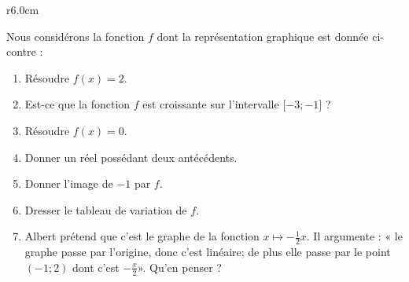 
\begin{exercice}\label{exosmath-0566}

\begin{wrapfigure}{r}{6.0cm}
   \vspace{-1cm}        %
   \centering
   
\end{wrapfigure}

    Nous considérons la fonction \( f\) dont la représentation graphique est donnée ci-contre :

    \begin{enumerate}
        \item
            Résoudre \( f(x)=2\).
        \item
            Est-ce que la fonction \( f\) est croissante sur l'intervalle \( \mathopen[ -3 ;-1 \mathclose]\) ?
        \item
            Résoudre \( f(x)=0\).
        \item
            Donner un réel possédant deux antécédents.
        \item 
            Donner l'image de \( -1\) par \( f\).
        \item
            Dresser le tableau de variation de \( f\).
        \item
            Albert prétend que c'est le graphe de la fonction \( x\mapsto -\frac{ 1 }{2}x\). Il argumente : « le graphe passe par l'origine, donc c'est linéaire; de plus elle passe par le point \( (-1;2)\) dont c'est \( -\frac{ x }{2}\)». Qu'en penser ?
    \end{enumerate}

\end{exercice}
